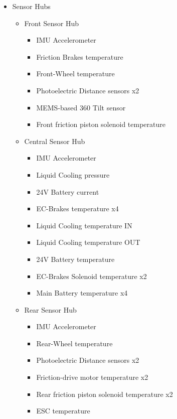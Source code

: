 \documentclass[main.tex]{subfiles}
\begin{document}
\begin{itemize}
	\item Sensor Hubs
    \begin{itemize}
    	\item Front Sensor Hub
        	\begin{itemize}
        		\item IMU Accelerometer
                \item Friction Brakes temperature
                \item Front-Wheel temperature
                \item Photoelectric Distance sensors x2
                \item MEMS-based 360 Tilt sensor
                \item Front friction piston solenoid temperature
        	\end{itemize}
        \item Central Sensor Hub
        	\begin{itemize}
            	\item IMU Accelerometer
                \item Liquid Cooling pressure
                \item 24V Battery current
        		\item EC-Brakes temperature x4
                \item Liquid Cooling temperature IN
                \item Liquid Cooling temperature OUT
                \item 24V Battery temperature
                \item EC-Brakes Solenoid temperature x2
                \item Main Battery temperature x4 
        	\end{itemize}
         \item Rear Sensor Hub
        	\begin{itemize}
                \item IMU Accelerometer
                \item Rear-Wheel temperature
        		\item Photoelectric Distance sensors x2
                \item Friction-drive motor temperature x2
                \item Rear friction piston solenoid temperature x2
                \item ESC temperature
        	\end{itemize}

\end{itemize}
\end{itemize}
\end{document}
